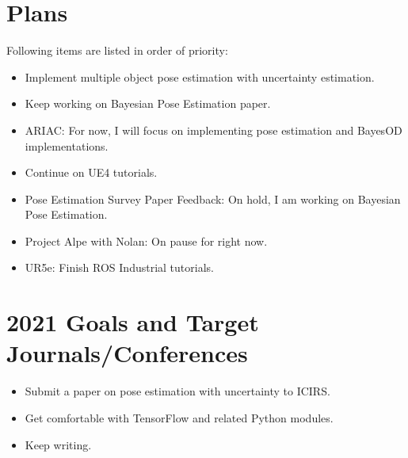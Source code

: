 \documentclass[11pt]{article}
\begin{document}

\section{Plans}
Following items are listed in order of priority:

\begin{itemize}

	\item Implement multiple object pose estimation with uncertainty estimation.
	\item Keep working on Bayesian Pose Estimation paper.
	\item ARIAC: For now, I will focus on implementing pose estimation and
	      BayesOD implementations.

	\item Continue on UE4 tutorials.

	\item Pose Estimation Survey Paper Feedback: On hold, I am working on
	      Bayesian Pose Estimation.
	\item Project Alpe with Nolan: On pause for right now.
	\item UR5e: Finish ROS Industrial tutorials.
\end{itemize}

\section{2021 Goals and Target Journals/Conferences}
\begin{itemize}
	\item Submit a paper on pose estimation with uncertainty to ICIRS.
	\item Get comfortable with TensorFlow and related Python modules.
	\item Keep writing.
\end{itemize}


\newpage


\end{document}
